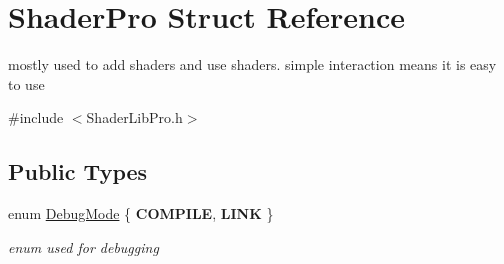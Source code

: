\hypertarget{struct_shader_pro}{\section{Shader\-Pro Struct Reference}
\label{struct_shader_pro}
}


mostly used to add shaders and use shaders. simple interaction means it is easy to use  




{\ttfamily \#include $<$Shader\-Lib\-Pro.\-h$>$}

\subsection*{Public Types}
\begin{DoxyCompactItemize}
\item 
enum \hyperlink{struct_shader_pro_a1dfb06c4b3b2d1651492a0a3c44ef555}{Debug\-Mode} \{ {\bfseries C\-O\-M\-P\-I\-L\-E}, 
{\bfseries L\-I\-N\-K}
 \}
\begin{DoxyCompactList}\small\item\em enum used for debugging \end{DoxyCompactList}\end{DoxyCompactItemize}
